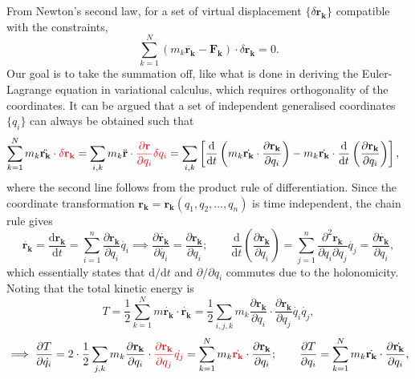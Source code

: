 \documentclass{article}
\begin{document}
From Newton's second law, for a set of virtual displacement $\{\delta \mathbf{r_k}\}$ compatible with the constraints,
\begin{equation}
    \sum\limits_{k=1}^{N} (m_k \ddot{\mathbf{r_k}} - \mathbf{F_k}) \cdot \delta \mathbf{r_k} = 0.  
    \label{eq:dlambert-thm}
\end{equation}
Our goal is to take the summation off, like what is done in deriving the Euler-Lagrange equation in variational calculus, which requires orthogonality of the coordinates. It can be argued that a set of independent generalised coordinates $\{q_i\}$ can always be obtained such that 
\begin{align*}
    \sum\limits_{k=1}^{N} m_k \ddot{\mathbf{r_k}}  \cdot \textcolor{red}{\delta \mathbf{r_k}} 
    &= \sum_{i,k} m_k \ddot{\mathbf{r} } \cdot  \textcolor{red}{\frac{\partial \mathbf{r} }{\partial q_i} \delta q_i }
    = \sum_{i,k} \left[ \frac{\mathrm{d}}{\mathrm{d}t} \left( m_k \dot{\mathbf{r_k}}\cdot \frac{\partial \mathbf{r_k} }{\partial q_i}  \right) - m_k \dot{\mathbf{r_k} } \cdot \frac{\mathrm{d}}{\mathrm{d}t} \left(\frac{\partial \mathbf{r_k}}{\partial q_i}  \right)\right],
\end{align*}
where the second line follows from the product rule of differentiation. Since the coordinate transformation $\mathbf{r_k} = \mathbf{r_k}(q_1, q_2, \ldots, q_n ) $ is time independent, the chain rule gives
\[
    \dot{\mathbf{r_k}} = \frac{\mathrm{d}\mathbf{r_k} }{\mathrm{d}t} = 
    \sum_{i=1}^{n} \frac{\partial \mathbf{r_k}}{\partial q_i} \dot{q_i} 
    \implies  
    \frac{\partial \dot{\mathbf{r_k} }}{\partial \dot{q_i} } =  \frac{\partial \mathbf{r_k} }{\partial q_i};
    \qquad 
    \frac{\mathrm{d}}{\mathrm{d}t} \left( \frac{\partial \mathbf{r_k} }{\partial q_i} \right)
    = \sum_{j=1}^{n} \frac{\partial ^{2} \mathbf{r_k} }{\partial q_i \partial q_j} \dot{q_j} 
    = \frac{\partial \dot{\mathbf{r_k} } }{\partial q_i},
\]
which essentially states that $\mathrm{d} / \mathrm{d} t $ and $\partial / \partial q_i$ commutes due to the holonomicity. Noting that the total kinetic energy is 
\[
    T = \frac{1}{2} \sum_{k=1}^{N} m \dot{\mathbf{r_k} } \cdot \dot{\mathbf{r_k} } 
    = \frac{1}{2} \sum_{i,j,k}m_k \frac{\partial \mathbf{r_k}}{\partial q_i} \cdot \frac{\partial \mathbf{r_k}}{\partial q_j} \dot{q_i} \dot{q_j},
\]
\[ \implies 
    \frac{\partial T}{\partial \dot{q_i} } = 
    2 \cdot \frac{1}{2} \sum_{j,k} m_k \frac{\partial \mathbf{r_k} }{\partial q_i} \cdot \textcolor{red}{\frac{\partial \mathbf{r_k}}{\partial q_j} \dot{q_j}}
    = \sum_{k=1}^{N} m_k \textcolor{red}{\dot{\mathbf{r_k}}} \cdot \frac{\partial \mathbf{r_k} }{\partial q_i };
    \qquad 
    \frac{\partial T}{\partial q_i} = \sum_{k=1}^{N} m_k \dot{\mathbf{r_k}} \cdot \frac{\partial \dot{\mathbf{r_k}}}{\partial q_i},  
\]
\end{document}
